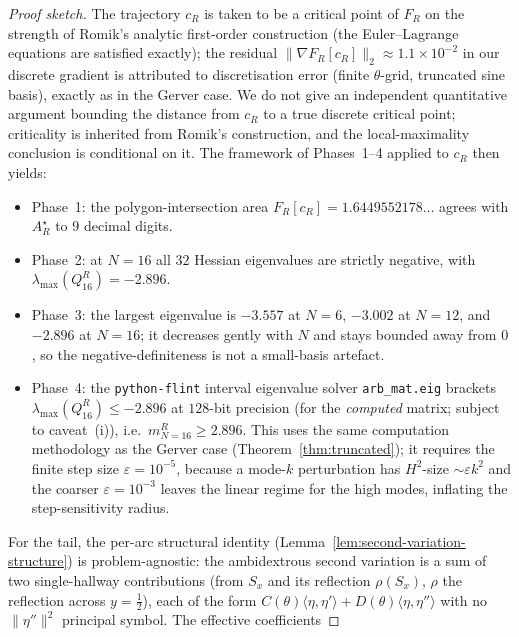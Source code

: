 \documentclass[11pt]{amsart}
\theoremstyle{plain}
\theoremstyle{definition}
\begin{document}
\begin{proof}[Proof sketch]
The trajectory $c_{R}$ is taken to be a critical point of $F_{R}$ on
the strength of Romik's analytic first-order construction (the
Euler--Lagrange equations are satisfied exactly); the residual
$\|\nabla F_{R}[c_{R}]\|_{2} \approx 1.1\times 10^{-2}$ in our discrete
gradient is attributed to discretisation error (finite $\theta$-grid,
truncated sine basis), exactly as in the Gerver case.  We do not give
an independent quantitative argument bounding the distance from
$c_{R}$ to a true discrete critical point; criticality is inherited
from Romik's construction, and the local-maximality conclusion is
conditional on it.  The framework of Phases~1--4 applied
to $c_{R}$ then yields:
\begin{itemize}
\item Phase~1: the polygon-intersection area $F_{R}[c_{R}] = 1.6449552178\ldots$
      agrees with $A_{R}^{\star}$ to 9 decimal digits.
\item Phase~2: at $N=16$ all $32$ Hessian eigenvalues are strictly
      negative, with $\lambda_{\max}(Q_{16}^{R}) = -2.896$.
\item Phase~3: the largest eigenvalue is $-3.557$ at $N=6$, $-3.002$
      at $N=12$, and $-2.896$ at $N=16$; it decreases gently with $N$
      and stays bounded away from $0$, so the negative-definiteness is
      not a small-basis artefact.
\item Phase~4: the \texttt{python-flint} interval eigenvalue solver
      \texttt{arb\_mat.eig} brackets
      $\lambda_{\max}(Q_{16}^{R}) \leq -2.896$ at $128$-bit precision
      (for the \emph{computed} matrix; subject to caveat~(i)),
      i.e.\ $m_{N=16}^{R} \geq 2.896$.  This uses the same
      computation methodology as the Gerver case
      (Theorem~\ref{thm:truncated}); it requires the finite step size
      $\varepsilon = 10^{-5}$, because a mode-$k$ perturbation has
      $H^{2}$-size $\sim \varepsilon k^{2}$ and the coarser
      $\varepsilon = 10^{-3}$ leaves the linear regime for the high
      modes, inflating the step-sensitivity radius.
\end{itemize}
For the tail, the per-arc structural identity
(Lemma~\ref{lem:second-variation-structure}) is problem-agnostic: the
ambidextrous second variation is a sum of two single-hallway
contributions (from $S_{x}$ and its reflection $\rho(S_{x})$, $\rho$
the reflection across $y=\tfrac12$), each of the form
$C(\theta)\langle\eta,\eta'\rangle + D(\theta)\langle\eta,\eta''\rangle$
with no $\|\eta''\|^{2}$ principal symbol.  The effective coefficients

\end{proof}
\end{document}
